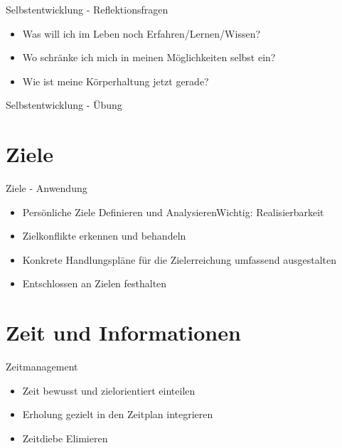 \begin{frame}[c]{Selbstentwicklung - Reflektionsfragen}
    \begin{itemize}
    \item Was will ich im Leben noch Erfahren/Lernen/Wissen? \newline
    \pause
    \item Wo schränke ich mich in meinen Möglichkeiten selbst ein? \newline
    \pause
    \item Wie ist meine Körperhaltung jetzt gerade?
    \end{itemize}
\end{frame}


\begin{frame}[c]{Selbstentwicklung - Übung}
    
\end{frame}





\section{Ziele}

\begin{frame}[c]{Ziele - Anwendung}
    \begin{itemize}
    \item Persönliche Ziele Definieren und Analysieren\pause Wichtig: Realisierbarkeit
    \pause
    \item Zielkonflikte erkennen und behandeln
    \pause
    \item Konkrete Handlungspläne für die Zielerreichung umfassend ausgestalten
    \pause
    \item Entschlossen an Zielen festhalten
    \end{itemize}
\end{frame}





\section{Zeit und Informationen}

\begin{frame}[c]{Zeitmanagement}
    \begin{itemize}
    \item Zeit bewusst und zielorientiert einteilen \newline
    \pause
    \item Erholung gezielt in den Zeitplan integrieren \newline
    \pause
    \item Zeitdiebe Elimieren
    \end{itemize}
\end{frame}



